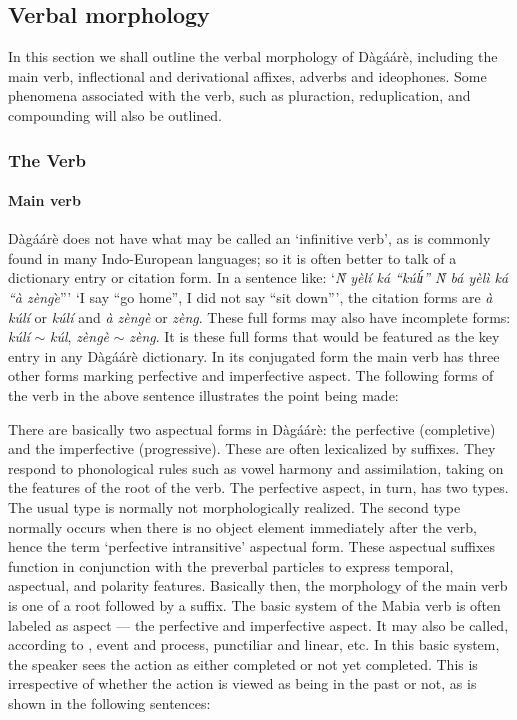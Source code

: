 \subsection{Verbal morphology}
In this section we shall outline the verbal morphology of Dàgáárè, including the main
verb, inflectional and derivational affixes, adverbs and ideophones. Some phenomena
associated with the verb, such as pluraction, reduplication, and compounding will also be
outlined.

\subsubsection{ The Verb}
\paragraph{ Main verb}
Dàgáárè does not have what may be called an ‘infinitive verb’, as is commonly found
in many Indo-European languages; so it is often better to talk of a dictionary entry or citation
form. In a sentence like: ‘\textit{Ǹ yèlí ká “kúlɪ́” Ǹ bá yèlì ká “à zènge}̀”’ ‘I say “go home”, I did
not say “sit down”’, the citation forms are \textit{à kúlí} or \textit{kúlí} and   \textit{à zèngè} or \textit{zèng}. These full forms may also have incomplete forms: \textit{kúlí}  $\sim$ \textit{kúl}, \textit{zèngè}  $\sim$ \textit{zèng}. It is these full forms
that would be featured as the key entry in any Dàgáárè dictionary.
In its conjugated form the main verb has three other forms marking perfective and
imperfective aspect. The following forms of the verb in the above sentence illustrates the
point being made:

\ea {}
\z\z


There are basically two aspectual forms in Dàgáárè: the perfective (completive) and the
imperfective (progressive). These are often lexicalized by suffixes. They respond to
phonological rules such as vowel harmony and assimilation, taking on the features of the root
of the verb. The perfective aspect, in turn, has two types. The usual type is normally not
morphologically realized. The second type normally occurs when there is no object element
immediately after the verb, hence the term ‘perfective intransitive’ aspectual form. These
aspectual suffixes function in conjunction with the preverbal particles to express temporal,
aspectual, and polarity features. Basically then, the morphology of the main verb is one of a
root followed by a suffix.
The basic system of the Mabia verb is often labeled as aspect — the perfective and
imperfective aspect. It may also be called, according to \citep{Bendor-Samuel1971}, event and
process, punctiliar and linear, etc. In this basic system, the speaker sees the action as either
completed or not yet completed. This is irrespective of whether the action is viewed as being
in the past or not, as is shown in the following sentences:

